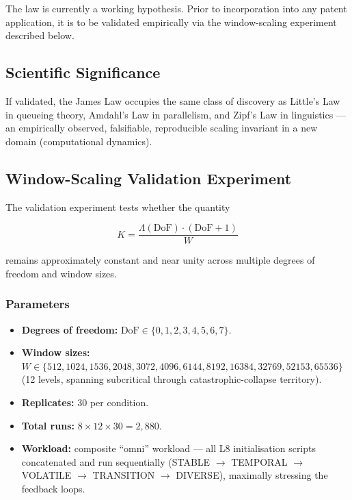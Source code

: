 
The law is currently a working hypothesis. Prior to incorporation into
any patent application, it is to be validated empirically via the
window-scaling experiment described below.

\subsection{Scientific Significance}

If validated, the James Law occupies the same class of discovery as
Little's Law in queueing theory, Amdahl's Law in parallelism, and
Zipf's Law in linguistics — an empirically observed, falsifiable,
reproducible scaling invariant in a new domain (computational dynamics).

\subsection{Window-Scaling Validation Experiment}

The validation experiment tests whether the quantity

\[
  K = \frac{\Lambda(\mathrm{DoF}) \cdot (\mathrm{DoF} + 1)}{W}
\]

remains approximately constant and near unity across multiple degrees of
freedom and window sizes.

\subsubsection{Parameters}

\begin{itemize}
  \item \textbf{Degrees of freedom:} $\mathrm{DoF} \in \{0, 1, 2, 3, 4, 5, 6, 7\}$.
  \item \textbf{Window sizes:} $W \in \{512, 1024, 1536, 2048, 3072, 4096,
    6144, 8192, 16384, 32769, 52153, 65536\}$ (12 levels, spanning
    subcritical through catastrophic-collapse territory).
  \item \textbf{Replicates:} 30 per condition.
  \item \textbf{Total runs:} $8 \times 12 \times 30 = 2{,}880$.
  \item \textbf{Workload:} composite ``omni'' workload — all L8 initialisation
    scripts concatenated and run sequentially
    (STABLE $\to$ TEMPORAL $\to$ VOLATILE $\to$ TRANSITION $\to$ DIVERSE),
    maximally stressing the feedback loops.
\end{itemize}

